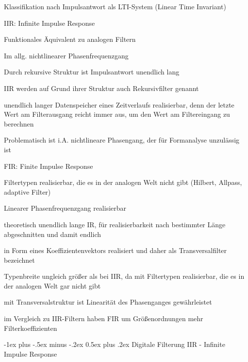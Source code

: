 \documentclass[a4paper]{article}
\makeatletter
\renewcommand{\section}{\@startsection{section}{1}{0mm}%
 {-1ex plus -.5ex minus -.2ex}%
 {0.5ex plus .2ex}%
 {\normalfont\large\bfseries}}
\makeatother
\begin{document}
\begin{multicols}{3}
  Klassifikation nach Impulsantwort als LTI-System (Linear Time Invariant)
  \begin{itemize*}
    \item IIR: Infinite Impulse Response
    \begin{itemize*}
      \item Funktionales Äquivalent zu analogen Filtern
      \item Im allg. nichtlinearer Phasenfrequenzgang
      \item Durch rekursive Struktur ist Impulsantwort unendlich lang
      \item IIR werden auf Grund ihrer Struktur auch Rekursivfilter genannt
      \item unendlich langer Datenspeicher eines Zeitverlaufs realisierbar, denn der letzte Wert am Filterausgang reicht immer aus, um den Wert am Filtereingang zu berechnen
      \item Problematisch ist i.A. nichtlineare Phasengang, der für Formanalyse unzulässig ist
    \end{itemize*}
    \item FIR: Finite Impulse Response
    \begin{itemize*}
      \item Filtertypen realisierbar, die es in der analogen Welt nicht gibt (Hilbert, Allpass, adaptive Filter)
      \item Linearer Phasenfrequenzgang realisierbar
      \item theoretisch unendlich lange IR, für realisierbarkeit nach bestimmter Länge abgeschnitten und damit endlich
      \item in Form eines Koeffizientenvektors realisiert und daher als Transversalfilter bezeichnet
      \item Typenbreite ungleich größer als bei IIR, da mit Filtertypen realisierbar, die es in der analogen Welt gar nicht gibt
      \item mit Transversalstruktur ist Linearität des Phasenganges gewährleistet
      \item im Vergleich zu IIR-Filtern haben FIR um Größenordnungen mehr Filterkoeffizienten
    \end{itemize*}
  \end{itemize*}

  \section{Digitale Filterung}\label{digitale-filterung}
  IIR - Infinite Impulse Response


\end{multicols}
\end{document}

